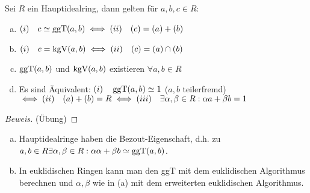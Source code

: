 \documentclass[a4paper]{report}
\begin{document}
\begin{satz} Sei $R$ ein Hauptidealring, dann gelten für $a, b, c \in R$:
  \begin{enumerate}[(a)]
    \item $(i) \quad c \simeq \operatorname{ggT}(a, b) \iff (ii) \quad (c) = (a) + (b)$
    \item $(i) \quad c = \operatorname{kgV}(a, b) \iff (ii) \quad (c) = (a) \cap (b)$
    \item $\operatorname{ggT}(a, b)$ und $\operatorname{kgV}(a, b)$ existieren $\forall a, b \in R$
    \item Es sind Äquivalent: $(i) \quad \operatorname{ggT}(a,b) \simeq 1$ ($a,b$ teilerfremd) $\iff (ii) \quad (a)+(b) = R \iff (iii) \quad \exists \alpha, \beta \in R : \alpha a + \beta b = 1$
  \end{enumerate}
\begin{proof}[Beweis]
(Übung)
\end{proof}
\end{satz}

\begin{bem*}
\begin{enumerate}[(a)]
  \item Hauptidealringe haben die Bezout-Eigenschaft, d.h. zu $a, b \in R \exists \alpha, \beta \in R : \alpha \alpha + \beta b \simeq \operatorname{ggT}(a,b)$.
  \item In euklidischen Ringen kann man den ggT mit dem euklidischen Algorithmus berechnen und $\alpha, \beta$ wie in (a) mit dem erweiterten euklidischen Algorithmus.
\end{enumerate}
\end{bem*}
\end{document}
